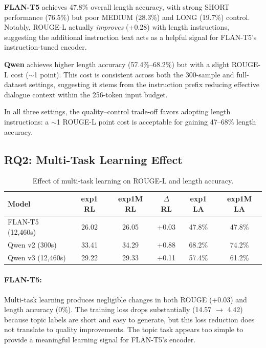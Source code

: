 \documentclass[11pt,a4paper]{article}
\begin{document}
\textbf{FLAN-T5} achieves 47.8\% overall length accuracy, with strong SHORT performance (76.5\%) but poor MEDIUM (28.3\%) and LONG (19.7\%) control.
Notably, ROUGE-L actually \emph{improves} (+0.28) with length instructions, suggesting the additional instruction text acts as a helpful signal for FLAN-T5's instruction-tuned encoder.

\textbf{Qwen} achieves higher length accuracy (57.4\%--68.2\%) but with a slight ROUGE-L cost ($\sim$1 point).
This cost is consistent across both the 300-sample and full-dataset settings, suggesting it stems from the instruction prefix reducing effective dialogue context within the 256-token input budget.

In all three settings, the quality--control trade-off favors adopting length instructions: a ${\sim}$1 ROUGE-L point cost is acceptable for gaining 47--68\% length accuracy.

\subsection{RQ2: Multi-Task Learning Effect}

\begin{table}[t]
\centering
\caption{Effect of multi-task learning on ROUGE-L and length accuracy.}
\label{tab:rq2}
\small
\begin{tabular}{@{}lccccc@{}}
\toprule
\textbf{Model} & \textbf{exp1 RL} & \textbf{exp1M RL} & \textbf{$\Delta$ RL} & \textbf{exp1 LA} & \textbf{exp1M LA} \\
\midrule
FLAN-T5 (12,460s) & 26.02 & 26.05 & +0.03 & 47.8\% & 47.8\% \\
Qwen v2 (300s) & 33.41 & 34.29 & +0.88 & 68.2\% & 74.2\% \\
Qwen v3 (12,460s) & 29.22 & 29.33 & +0.11 & 57.4\% & 61.2\% \\
\bottomrule
\end{tabular}
\end{table}

\paragraph{FLAN-T5:}
Multi-task learning produces negligible changes in both ROUGE (+0.03) and length accuracy (0\%).
The training loss drops substantially (14.57 $\to$ 4.42) because topic labels are short and easy to generate, but this loss reduction does not translate to quality improvements.
The topic task appears too simple to provide a meaningful learning signal for FLAN-T5's encoder.
\end{document}
